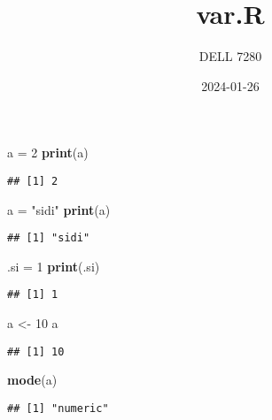 \documentclass[
]{article}
\title{var.R}
\author{DELL 7280}
\date{2024-01-26}
\newenvironment{Shaded}{\begin{snugshade}}{\end{snugshade}}
\newcommand{\DecValTok}[1]{\textcolor[rgb]{0.00,0.00,0.81}{#1}}
\newcommand{\FunctionTok}[1]{\textcolor[rgb]{0.13,0.29,0.53}{\textbf{#1}}}
\newcommand{\NormalTok}[1]{#1}
\newcommand{\OtherTok}[1]{\textcolor[rgb]{0.56,0.35,0.01}{#1}}
\newcommand{\StringTok}[1]{\textcolor[rgb]{0.31,0.60,0.02}{#1}}
\begin{document}
\maketitle

\begin{Shaded}
\begin{Highlighting}[]
\NormalTok{a }\OtherTok{=} \DecValTok{2}
\FunctionTok{print}\NormalTok{(a)}
\end{Highlighting}
\end{Shaded}

\begin{verbatim}
## [1] 2
\end{verbatim}

\begin{Shaded}
\begin{Highlighting}[]
\NormalTok{a }\OtherTok{=} \StringTok{"sidi"}
\FunctionTok{print}\NormalTok{(a)}
\end{Highlighting}
\end{Shaded}

\begin{verbatim}
## [1] "sidi"
\end{verbatim}

\begin{Shaded}
\begin{Highlighting}[]
\NormalTok{.si }\OtherTok{=} \DecValTok{1}
\FunctionTok{print}\NormalTok{(.si)}
\end{Highlighting}
\end{Shaded}

\begin{verbatim}
## [1] 1
\end{verbatim}

\begin{Shaded}
\begin{Highlighting}[]
\NormalTok{a }\OtherTok{\textless{}{-}} \DecValTok{10}
\NormalTok{a}
\end{Highlighting}
\end{Shaded}

\begin{verbatim}
## [1] 10
\end{verbatim}

\begin{Shaded}
\begin{Highlighting}[]
\FunctionTok{mode}\NormalTok{(a)}
\end{Highlighting}
\end{Shaded}

\begin{verbatim}
## [1] "numeric"
\end{verbatim}
\end{document}
